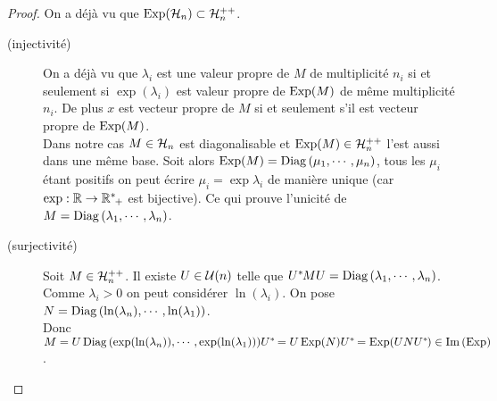 \begin{proof}
 On a déjà vu que $\operatorname{Exp}(\mathcal{H}_n) \subset \mathcal{H}^{++}_n$.
 
 \begin{description}
  \item [(injectivité)] On a déjà vu que $\lambda_i$ est une valeur propre de
$M$ de multiplicité $n_i$ si et seulement si $\exp(\lambda_i)$ est valeur propre
de $\operatorname{Exp}(M)$ de même multiplicité $n_i$. De plus $x$ est vecteur propre de $M$
si et seulement s'il est vecteur propre de $\operatorname{Exp}(M)$.\\
Dans notre cas $M\in\mathcal{H}_n$ est diagonalisable et $\operatorname{Exp}(M)\in\mathcal{H}^{++}_n$ l'est aussi
dans une même base. Soit alors $\operatorname{Exp}(M) = \operatorname{Diag\,}(\mu_1,\cdots,\mu_n)$, tous
les $\mu_i$ étant positifs on peut écrire $\mu_i = \exp{\lambda_i}$ de manière
unique (car $\exp : \mathbb{R} \rightarrow \mathbb{R}^{*}\hspace{-0.1em}_+$ est bijective). Ce qui prouve
l'unicité de $M = \operatorname{Diag\,}(\lambda_1,\cdots,\lambda_n)$.

\item [(surjectivité)] Soit $M \in\mathcal{H}^{++}_n$. Il existe $U\in\mathcal{U}(n)$ telle que
$U^{*}\hspace{-0.1em}MU=\operatorname{Diag\,}(\lambda_1,\cdots,\lambda_n)$. Comme $\lambda_i > 0$ on peut
considérer $\ln(\lambda_i)$. On pose $N = \operatorname{Diag\,}(\ln(\lambda_n),
\cdots, \ln(\lambda_1))$.\\
Donc $M = U\operatorname{Diag\,}(\exp(\ln(\lambda_n)), \cdots, \exp(\ln(\lambda_1)))U^{*}\hspace{-0.1em}
 = U\operatorname{Exp}(N)U^{*}\hspace{-0.1em} = \operatorname{Exp}(UNU^{*}\hspace{-0.1em}) \in\operatorname{Im\,}(\operatorname{Exp})$.


\end{description}
\end{proof}
